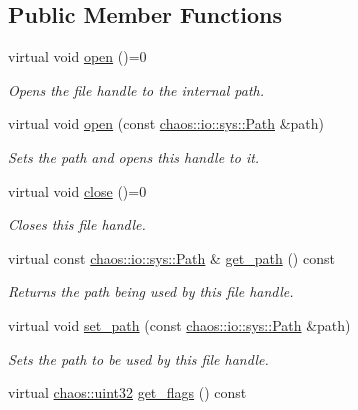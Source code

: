 \subsection*{Public Member Functions}
\begin{DoxyCompactItemize}
\item 
virtual void \hyperlink{classchaos_1_1io_1_1sys_1_1_file_handle_aaab721e850f11cd1f1bf3dba8e4ab2a1}{open} ()=0
\begin{DoxyCompactList}\small\item\em Opens the file handle to the internal path. \end{DoxyCompactList}\item 
virtual void \hyperlink{classchaos_1_1io_1_1sys_1_1_file_handle_ac38cdc6e3d48bba2d6e143265c7aaaad}{open} (const \hyperlink{classchaos_1_1io_1_1sys_1_1_path}{chaos\+::io\+::sys\+::\+Path} \&path)
\begin{DoxyCompactList}\small\item\em Sets the path and opens this handle to it. \end{DoxyCompactList}\item 
virtual void \hyperlink{classchaos_1_1io_1_1sys_1_1_file_handle_ac4dd796f7080d16fd2b141806e23f004}{close} ()=0
\begin{DoxyCompactList}\small\item\em Closes this file handle. \end{DoxyCompactList}\item 
\hypertarget{classchaos_1_1io_1_1sys_1_1_file_handle_aeb0c8615f3b16ceb7f9130b1482b3b42}{}virtual const \hyperlink{classchaos_1_1io_1_1sys_1_1_path}{chaos\+::io\+::sys\+::\+Path} \& \hyperlink{classchaos_1_1io_1_1sys_1_1_file_handle_aeb0c8615f3b16ceb7f9130b1482b3b42}{get\+\_\+path} () const \label{classchaos_1_1io_1_1sys_1_1_file_handle_aeb0c8615f3b16ceb7f9130b1482b3b42}

\begin{DoxyCompactList}\small\item\em Returns the path being used by this file handle. \end{DoxyCompactList}\item 
virtual void \hyperlink{classchaos_1_1io_1_1sys_1_1_file_handle_a14272fcf341c329bf15f7198b5e08573}{set\+\_\+path} (const \hyperlink{classchaos_1_1io_1_1sys_1_1_path}{chaos\+::io\+::sys\+::\+Path} \&path)
\begin{DoxyCompactList}\small\item\em Sets the path to be used by this file handle. \end{DoxyCompactList}\item 
\hypertarget{classchaos_1_1io_1_1sys_1_1_file_handle_a5cfd6d2ef58b86bf4a8b729a0825f508}{}virtual \hyperlink{namespacechaos_a8641b3ae4551f0b35570d4f9f4ec22d9}{chaos\+::uint32} \hyperlink{classchaos_1_1io_1_1sys_1_1_file_handle_a5cfd6d2ef58b86bf4a8b729a0825f508}{get\+\_\+flags} () const \label{classchaos_1_1io_1_1sys_1_1_file_handle_a5cfd6d2ef58b86bf4a8b729a0825f508}


\end{DoxyCompactItemize}
